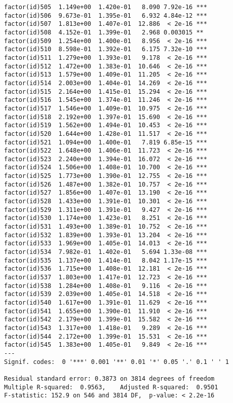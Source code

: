 \documentclass[]{article}
\begin{document}
\begin{verbatim}
factor(id)505  1.149e+00  1.420e-01   8.090 7.92e-16 ***
factor(id)506  9.673e-01  1.395e-01   6.932 4.84e-12 ***
factor(id)507  1.813e+00  1.407e-01  12.886  < 2e-16 ***
factor(id)508  4.152e-01  1.399e-01   2.968 0.003015 ** 
factor(id)509  1.254e+00  1.400e-01   8.956  < 2e-16 ***
factor(id)510  8.598e-01  1.392e-01   6.175 7.32e-10 ***
factor(id)511  1.279e+00  1.393e-01   9.178  < 2e-16 ***
factor(id)512  1.472e+00  1.383e-01  10.646  < 2e-16 ***
factor(id)513  1.579e+00  1.409e-01  11.205  < 2e-16 ***
factor(id)514  2.003e+00  1.404e-01  14.269  < 2e-16 ***
factor(id)515  2.164e+00  1.415e-01  15.294  < 2e-16 ***
factor(id)516  1.545e+00  1.374e-01  11.246  < 2e-16 ***
factor(id)517  1.546e+00  1.409e-01  10.975  < 2e-16 ***
factor(id)518  2.192e+00  1.397e-01  15.690  < 2e-16 ***
factor(id)519  1.562e+00  1.494e-01  10.453  < 2e-16 ***
factor(id)520  1.644e+00  1.428e-01  11.517  < 2e-16 ***
factor(id)521  1.094e+00  1.400e-01   7.819 6.85e-15 ***
factor(id)522  1.648e+00  1.406e-01  11.723  < 2e-16 ***
factor(id)523  2.240e+00  1.394e-01  16.072  < 2e-16 ***
factor(id)524  1.506e+00  1.408e-01  10.700  < 2e-16 ***
factor(id)525  1.773e+00  1.390e-01  12.755  < 2e-16 ***
factor(id)526  1.487e+00  1.382e-01  10.757  < 2e-16 ***
factor(id)527  1.856e+00  1.407e-01  13.190  < 2e-16 ***
factor(id)528  1.433e+00  1.391e-01  10.301  < 2e-16 ***
factor(id)529  1.311e+00  1.391e-01   9.427  < 2e-16 ***
factor(id)530  1.174e+00  1.423e-01   8.251  < 2e-16 ***
factor(id)531  1.493e+00  1.389e-01  10.752  < 2e-16 ***
factor(id)532  1.839e+00  1.393e-01  13.204  < 2e-16 ***
factor(id)533  1.969e+00  1.405e-01  14.013  < 2e-16 ***
factor(id)534  7.982e-01  1.402e-01   5.694 1.33e-08 ***
factor(id)535  1.137e+00  1.414e-01   8.042 1.17e-15 ***
factor(id)536  1.715e+00  1.408e-01  12.181  < 2e-16 ***
factor(id)537  1.803e+00  1.417e-01  12.723  < 2e-16 ***
factor(id)538  1.284e+00  1.408e-01   9.116  < 2e-16 ***
factor(id)539  2.039e+00  1.405e-01  14.518  < 2e-16 ***
factor(id)540  1.617e+00  1.391e-01  11.629  < 2e-16 ***
factor(id)541  1.655e+00  1.390e-01  11.910  < 2e-16 ***
factor(id)542  2.179e+00  1.399e-01  15.582  < 2e-16 ***
factor(id)543  1.317e+00  1.418e-01   9.289  < 2e-16 ***
factor(id)544  2.172e+00  1.399e-01  15.531  < 2e-16 ***
factor(id)545  1.383e+00  1.405e-01   9.849  < 2e-16 ***
---
Signif. codes:  0 '***' 0.001 '**' 0.01 '*' 0.05 '.' 0.1 ' ' 1

Residual standard error: 0.3873 on 3814 degrees of freedom
Multiple R-squared:  0.9563,    Adjusted R-squared:  0.9501 
F-statistic: 152.9 on 546 and 3814 DF,  p-value: < 2.2e-16
\end{verbatim}
\end{document}
